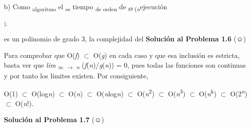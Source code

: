 \documentclass[12pt]{article}
\renewcommand{\_}{\kern-1.5pt\textunderscore\kern-1.5pt}
\begin{document}
{\fontsize{10pt}{12.0pt}\selectfont b) Como \textsubscript{algoritmo }el \textsubscript{es }tiempo \textsubscript{de orden }de \textsubscript{$ \Theta $ (\textit{n}}ejecución {\fontsize{7pt}{8.4pt}\textsubscript{). }{\fontsize{10pt}{12.0pt}\selectfont es un polinomio de grado 3, la complejidad del \textbf{Solución al Problema 1.6 }(☺) \par}\par}\par}\par

\begin{justify}
{\fontsize{10pt}{12.0pt}\selectfont Para comprobar que O(\textit{f}) $ \subset $  O(\textit{g}) en cada caso y que esa inclusión es estricta, basta ver que \textit{lim }\textsubscript{$\infty$ $ \rightarrow $ \textit{n }}(\textit{f}(\textit{n})/\textit{g}(\textit{n})) = 0, pues todas las funciones son continuas y por tanto los límites existen. Por consiguiente, \par}
\end{justify}\par

{\fontsize{10pt}{12.0pt}\selectfont O(1) $ \subset $  O(log\textit{n}) $ \subset $  O(\textit{n}) $ \subset $  O(\textit{n}log\textit{n}) $ \subset $  O(\textit{n}\textsuperscript{2}) $ \subset $  O(\textit{n}\textsuperscript{3}) $ \subset $  O(\textit{n}\textsuperscript{k}) $ \subset $  O(2\textit{\textsuperscript{n}}) $ \subset $  O(\textit{n}!). \par}\par

{\fontsize{10pt}{12.0pt}\selectfont \textbf{Solución al Problema 1.7 }(☺) \par}\par
\end{document}
